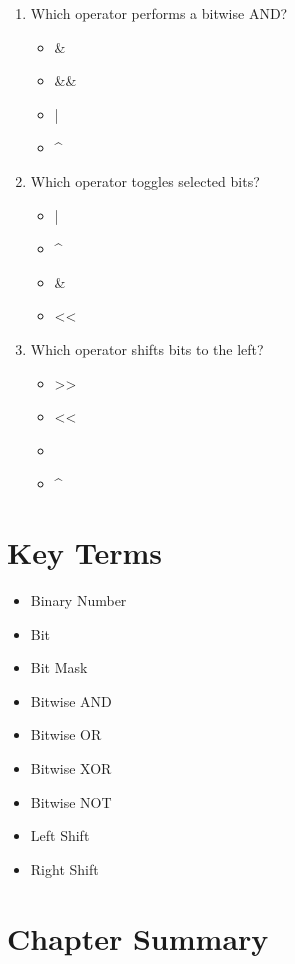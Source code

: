 \documentclass[12pt,openany]{book}
\begin{document}
\begin{enumerate}
    \item Which operator performs a bitwise AND?
    \begin{itemize}
        \item \&
        \item \&\&
        \item |
        \item ^
    \end{itemize}

    \item Which operator toggles selected bits?
    \begin{itemize}
        \item |
        \item ^
        \item \&
        \item <<
    \end{itemize}

    \item Which operator shifts bits to the left?
    \begin{itemize}
        \item >>
        \item <<
        \item ~
        \item ^
    \end{itemize}
\end{enumerate}

\section{Key Terms}

\begin{itemize}
    \item Binary Number
    \item Bit
    \item Bit Mask
    \item Bitwise AND
    \item Bitwise OR
    \item Bitwise XOR
    \item Bitwise NOT
    \item Left Shift
    \item Right Shift
\end{itemize}

\section{Chapter Summary}
\end{document}
